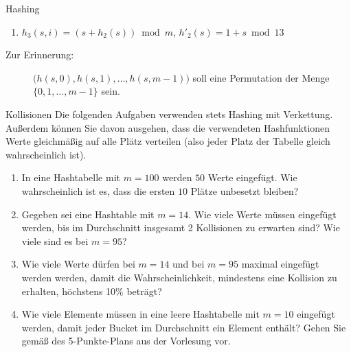 \documentclass[11pt,a4paper]{article}
\begin{document}
\begin{aufgabe}{1}{Hashing}
\begin{enumerate}
\begin{enumerate}[label=\roman*)]
            \item $h_3(s, i) = (s + h_2(s)) \bmod{m}$, $h'_2(s) = 1 + s \bmod{13}$
        \end{enumerate}
        \begin{description}
            \item[Zur Erinnerung:] $\big(h(s, 0), h(s, 1), \ldots, h(s, m - 1)\big)$ soll eine Permutation der Menge $\{0, 1, \ldots, m - 1\}$ sein.
        \end{description}
    \end{enumerate}
\end{aufgabe}

\begin{aufgabe}{2}{Kollisionen}
    Die folgenden Aufgaben verwenden stets Hashing mit Verkettung.
    Außerdem können Sie davon ausgehen, dass die verwendeten Hashfunktionen Werte gleichmäßig auf alle Plätz verteilen (also jeder Platz der Tabelle gleich wahrscheinlich ist).
    \begin{enumerate}
        \item In eine Hashtabelle mit $m = 100$ werden $50$ Werte eingefügt.
        Wie wahrscheinlich ist es, dass die ersten $10$ Plätze unbesetzt bleiben?
        \item Gegeben sei eine Hashtable mit $m = 14$. Wie viele Werte müssen eingefügt werden, bis im Durchschnitt insgesamt 2 Kollisionen zu erwarten sind?
        Wie viele sind es bei $m = 95$?
        \item Wie viele Werte dürfen bei $m = 14$ und bei $m = 95$ maximal eingefügt werden werden, damit die Wahrscheinlichkeit, mindestens eine Kollision zu erhalten, höchstens 10\% beträgt?
        \item Wie viele Elemente müssen in eine leere Hashtabelle mit $m = 10$ eingefügt werden, damit jeder Bucket im Durchschnitt ein Element enthält? Gehen Sie gemäß des \glqq{}5-Punkte-Plans\grqq{} aus der Vorlesung vor.
    \end{enumerate}
\end{aufgabe}
\end{document}
